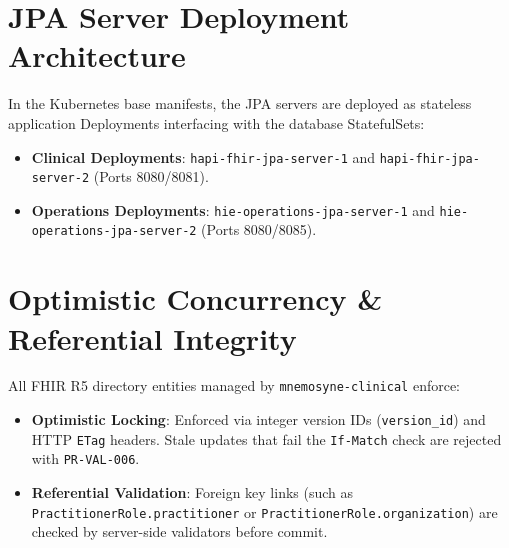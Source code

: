 \section{JPA Server Deployment Architecture}

In the Kubernetes base manifests, the JPA servers are deployed as stateless application Deployments interfacing with the database StatefulSets:
\begin{itemize}
    \item \textbf{Clinical Deployments}: \texttt{hapi-fhir-jpa-server-1} and \texttt{hapi-fhir-jpa-server-2} (Ports 8080/8081).
    \item \textbf{Operations Deployments}: \texttt{hie-operations-jpa-server-1} and \texttt{hie-operations-jpa-server-2} (Ports 8080/8085).
\end{itemize}

\section{Optimistic Concurrency \& Referential Integrity}

All FHIR R5 directory entities managed by \texttt{mnemosyne-clinical} enforce:
\begin{itemize}
    \item \textbf{Optimistic Locking}: Enforced via integer version IDs (\nolinkurl{version_id}) and HTTP \texttt{ETag} headers. Stale updates that fail the \texttt{If-Match} check are rejected with \texttt{PR-VAL-006}.
    \item \textbf{Referential Validation}: Foreign key links (such as \nolinkurl{PractitionerRole.practitioner} or \nolinkurl{PractitionerRole.organization}) are checked by server-side validators before commit.
\end{itemize}

\newpage
